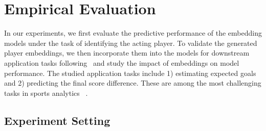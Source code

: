 \documentclass{article}
\newcommand{\latentvariables}{\mathbf{z}}
\newcommand{\state}{\mathbf{s}}
\newcommand{\action}{\mathbf{a}}
\newcommand{\prior}{p}
\begin{document}

\section{Empirical Evaluation}
In our experiments, we first evaluate the predictive performance of the embedding models under the task of identifying the acting player. To validate the generated player embeddings, we then incorporate them into the models for downstream application tasks following~\cite{PetersNIGCLZ18,AkbikBV18} and study the impact of embeddings on model performance.
The studied application tasks include 1) estimating expected goals and 2) predicting the final score difference. These are among the most challenging tasks in sports analytics %
~\cite{ganguly2018problem}. 

\subsection{Experiment Setting}
\end{document}
